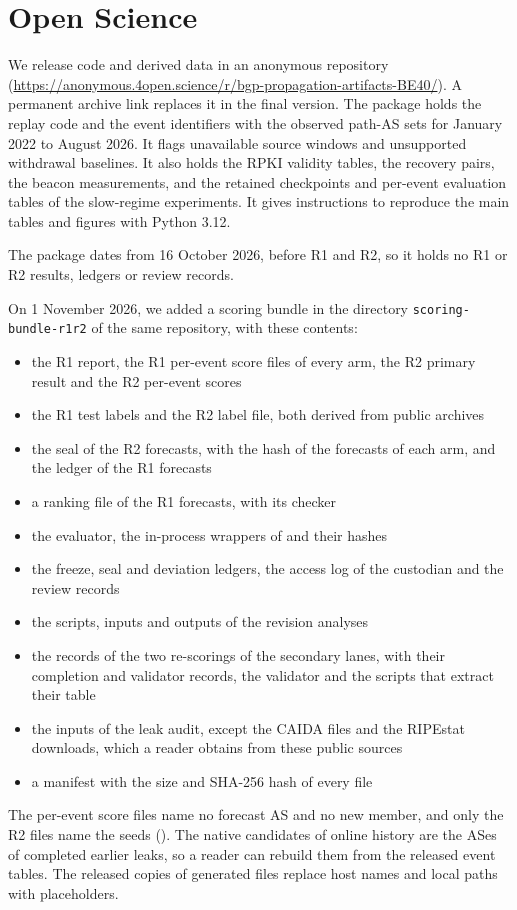 \section{Open Science}\label{sec:openscience}
We release code and derived data in an anonymous repository (\url{https://anonymous.4open.science/r/bgp-propagation-artifacts-BE40/}).
A permanent archive link replaces it in the final version.
The package holds the replay code and the event identifiers with the observed path-AS sets for January 2022 to August 2026.
It flags unavailable source windows and unsupported withdrawal baselines.
It also holds the RPKI validity tables, the recovery pairs, the beacon measurements, and the retained checkpoints and per-event evaluation tables of the slow-regime experiments.
It gives instructions to reproduce the main tables and figures with Python 3.12.

The package dates from 16 October 2026, before R1 and R2, so it holds no R1 or R2 results, ledgers or review records.

On 1 November 2026, we added a scoring bundle in the directory \texttt{scoring-bundle-r1r2} of the same repository, with these contents:
\begin{itemize}
\item the R1 report, the R1 per-event score files of every arm, the R2 primary result and the R2 per-event scores
\item the R1 test labels and the R2 label file, both derived from public archives
\item the seal of the R2 forecasts, with the hash of the forecasts of each arm, and the ledger of the R1 forecasts
\item a ranking file of the R1 forecasts, with its checker
\item the evaluator, the in-process wrappers of  and their hashes
\item the freeze, seal and deviation ledgers, the access log of the custodian and the review records
\item the scripts, inputs and outputs of the revision analyses
\item the records of the two re-scorings of the secondary lanes, with their completion and validator records, the validator and the scripts that extract their table
\item the inputs of the leak audit, except the CAIDA files and the RIPEstat downloads, which a reader obtains from these public sources
\item a manifest with the size and SHA-256 hash of every file
\end{itemize}
The per-event score files name no forecast AS and no new member, and only the R2 files name the seeds ().
The native candidates of online history are the ASes of completed earlier leaks, so a reader can rebuild them from the released event tables.
The released copies of generated files replace host names and local paths with placeholders.

